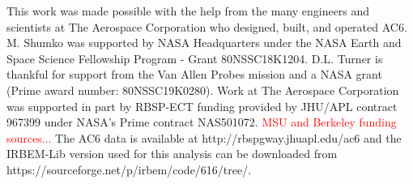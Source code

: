 \documentclass[draft]{agujournal2019}
\begin{document}
\acknowledgments
This work was made possible with the help from the many engineers and scientists at The Aerospace Corporation who designed, built, and operated AC6. M. Shumko was supported by NASA Headquarters under the NASA Earth and Space Science Fellowship Program - Grant 80NSSC18K1204. D.L. Turner is thankful for support from the Van Allen Probes mission and a NASA grant (Prime award number: 80NSSC19K0280). Work at The Aerospace Corporation was supported in part by RBSP-ECT funding provided by JHU/APL contract 967399 under NASA's Prime contract NAS501072. \textcolor{red}{MSU and Berkeley funding sources...} The AC6 data is available at http://rbspgway.jhuapl.edu/ac6 and the IRBEM-Lib version used for this analysis can be downloaded from https://sourceforge.net/p/irbem/code/616/tree/.


\end{document}
